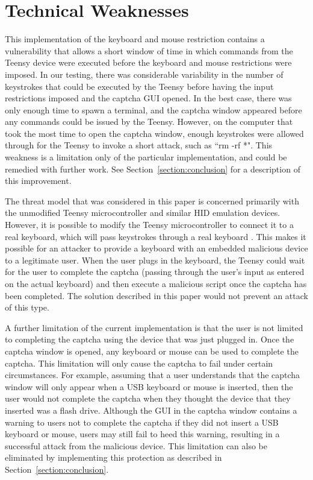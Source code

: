 \documentclass[pagenumbers]{ieee}
\begin{document}

\section{Technical Weaknesses}
\label{section:weakness}

This implementation of the keyboard and mouse restriction contains a vulnerability that allows a short window of time in which commands from the Teensy device were executed before the keyboard and mouse restrictions were imposed. In our testing, there was considerable variability in the number of keystrokes that could be executed by the Teensy before having the input restrictions imposed and the captcha GUI opened. In the best case, there was only enough time to spawn a terminal, and the captcha window appeared before any commands could be issued by the Teensy. However, on the computer that took the most time to open the captcha window, enough keystrokes were allowed through for the Teensy to invoke a short attack, such as ``rm -rf *".  This weakness is a limitation only of the particular implementation, and could be remedied with further work. See Section~\ref{section:conclusion} for a description of this improvement.

The threat model that was considered in this paper is concerned primarily with the unmodified Teensy microcontroller and similar HID emulation devices. However, it is possible to modify the Teensy microcontroller to connect it to a real keyboard, which will pass keystrokes through a real keyboard \cite{pjrc}. This makes it possible for an attacker to provide a keyboard with an embedded malicious device to a legitimate user. When the user plugs in the keyboard, the Teensy could wait for the user to complete the captcha (passing through the user's input as entered on the actual keyboard) and then execute a malicious script once the captcha has been completed. The solution described in this paper would not prevent an attack of this type.

A further limitation of the current implementation is that the user is not limited to completing the captcha using the device that was just plugged in.  Once the captcha window is opened, any keyboard or mouse can be used to complete the captcha. This limitation will only cause the captcha to fail under certain circumstances. For example, assuming that a user understands that the captcha window will only appear when a USB keyboard or mouse is inserted, then the user would not complete the captcha when they thought the device that they inserted was a flash drive. Although the GUI in the captcha window contains a warning to users not to complete the captcha if they did not insert a USB keyboard or mouse, users may still fail to heed this warning, resulting in a successful attack from the malicious device. This limitation can also be eliminated by implementing this protection as described in Section~\ref{section:conclusion}.
\end{document}
